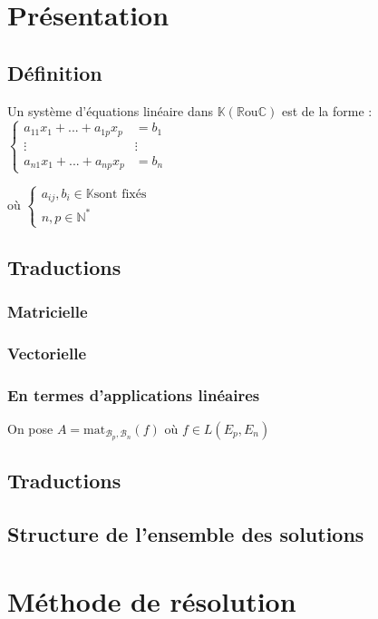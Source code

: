 \documentclass[12pt,a4paper,french]{book}
\begin{document}
	\section{Présentation}
		\subsection{Définition}
			Un système d'équations linéaire dans $\mathbb{K} (\mathbb{R} \mbox{ou} \mathbb{C})$ est de la forme : \(\left\lbrace \begin{array}{ll}
				a_{11} x_1 + ... + a_{1p} x_p &=b_1 \\ \vdots & \vdots \\ a_{n1} x_1 + ... + a_{np} x_p &=b_n
			\end{array}\right.\)
			
			où \(\left\lbrace \begin{array}{ll}
				a_{ij},b_i \in \mathbb{K} \mbox{sont fixés} \\ n,p \in \mathbb{N}^{\ast}
			\end{array}\right.\)
			
		\subsection{Traductions}
			\subsubsection{Matricielle}
			\subsubsection{Vectorielle}
			\subsubsection{En termes d'applications linéaires}
				On pose $A = \mbox{mat}_{\mathcal{B}_p,\mathcal{B}_n}(f) \mbox{ où } f \in L(E_p,E_n)$
		\subsection{Traductions}
		\subsection{Structure de l'ensemble des solutions}
	\section{Méthode de résolution}
\end{document}
